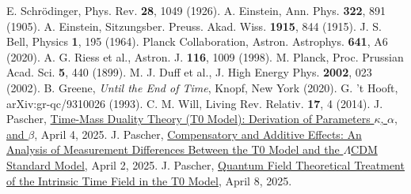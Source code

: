 \documentclass[twocolumn,aps,prl]{revtex4-2}
\begin{document}
\begin{thebibliography}{99}
		 E. Schrödinger, Phys. Rev. \textbf{28}, 1049 (1926).
		 A. Einstein, Ann. Phys. \textbf{322}, 891 (1905).
		 A. Einstein, Sitzungsber. Preuss. Akad. Wiss. \textbf{1915}, 844 (1915).
		 J. S. Bell, Physics \textbf{1}, 195 (1964).
		 Planck Collaboration, Astron. Astrophys. \textbf{641}, A6 (2020).
		 A. G. Riess et al., Astron. J. \textbf{116}, 1009 (1998).
		 M. Planck, Proc. Prussian Acad. Sci. \textbf{5}, 440 (1899).
		 M. J. Duff et al., J. High Energy Phys. \textbf{2002}, 023 (2002).
		 B. Greene, \textit{Until the End of Time}, Knopf, New York (2020).
		 G. 't Hooft, arXiv:gr-qc/9310026 (1993).
		 C. M. Will, Living Rev. Relativ. \textbf{17}, 4 (2014).
		 J. Pascher, \href{https://github.com/jpascher/T0-Time-Mass-Duality/tree/main/2/pdf/English/ZeitMasseT0ParamsEn.pdf}{Time-Mass Duality Theory (T0 Model): Derivation of Parameters \(\kappa\), \(\alpha\), and \(\beta\)}, April 4, 2025.
		 J. Pascher, \href{https://github.com/jpascher/T0-Time-Mass-Duality/tree/main/2/pdf/English/MessdifferenzenT0StandardEn.pdf}{Compensatory and Additive Effects: An Analysis of Measurement Differences Between the T0 Model and the \(\Lambda\)CDM Standard Model}, April 2, 2025.
				 J. Pascher, \href{https://github.com/jpascher/T0-Time-Mass-Duality/tree/main/2/pdf/English/QFTIntrinsischesZeitT0En.pdf}{Quantum Field Theoretical Treatment of the Intrinsic Time Field in the T0 Model}, April 8, 2025.
	\end{thebibliography}
	
\end{document}
